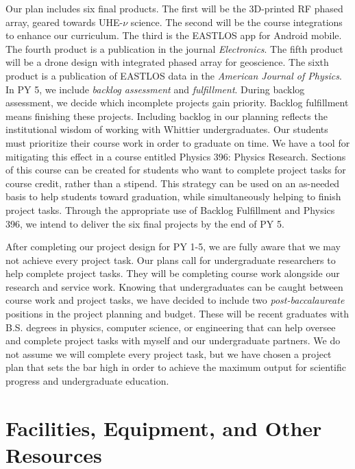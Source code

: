 \documentclass[11pt]{amsart}
\begin{document}
Our plan includes six final products.  The first will be the 3D-printed RF phased array, geared towards UHE-$\nu$ science.  The second will be the course integrations to enhance our curriculum.  The third is the EASTLOS app for Android mobile.  The fourth product is a publication in the journal \textit{Electronics}.  The fifth product will be a drone design with integrated phased array for geoscience.  The sixth product is a publication of EASTLOS data in the \textit{American Journal of Physics}.  In PY 5, we include \textit{backlog assessment} and \textit{fulfillment}.  During backlog assessment, we decide which incomplete projects gain priority.  Backlog fulfillment means finishing these projects.  Including backlog in our planning reflects the institutional wisdom of working with Whittier undergraduates.  Our students must prioritize their course work in order to graduate on time.  We have a tool for mitigating this effect in a course entitled Physics 396: Physics Research.  Sections of this course can be created for students who want to complete project tasks for course credit, rather than a stipend.  This strategy can be used on an as-needed basis to help students toward graduation, while simultaneously helping to finish project tasks.  Through the appropriate use of Backlog Fulfillment and Physics 396, we intend to deliver the six final projects by the end of PY 5.

After completing our project design for PY 1-5, we are fully aware that we may not achieve every project task.  Our plans call for undergraduate researchers to help complete project tasks.  They will be completing course work alongside our research and service work.  Knowing that undergraduates can be caught between course work and project tasks, we have decided to include two \textit{post-baccalaureate} positions in the project planning and budget.  These will be recent graduates with B.S. degrees in physics, computer science, or engineering that can help oversee and complete project tasks with myself and our undergraduate partners.  We do not assume we will complete every project task, but we have chosen a project plan that sets the bar high in order to achieve the maximum output for scientific progress and undergraduate education.

\clearpage

\section{Facilities, Equipment, and Other Resources}
\end{document}
